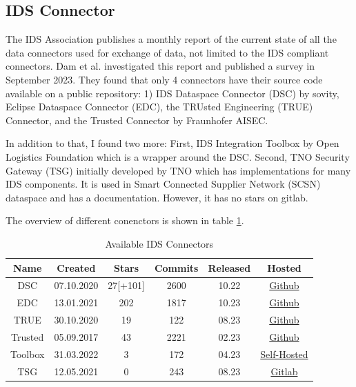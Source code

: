 \documentclass{article}
\begin{document}

\subsection*{IDS Connector}
The IDS Association publishes a monthly report of the current state of all the data connectors used for exchange of data, not limited to the IDS compliant connectors.
 Dam et al. \cite{dam_survey_2023} investigated this report and published a survey in September 2023. They found that only 4 connectors have their source code available on a public repository: 1) IDS Dataspace Connector (DSC) by sovity, Eclipse Dataspace Connector (EDC), the TRUsted Engineering (TRUE) Connector, and the Trusted Connector by Fraunhofer AISEC.

In addition to that, I found two more: First, IDS Integration Toolbox by Open Logistics Foundation which is a wrapper around the DSC. Second, TNO Security Gateway (TSG) initially developed by TNO which has implementations for many IDS components. It is used in Smart Connected Supplier Network (SCSN) dataspace and has a documentation.
However, it has no stars on gitlab.

The overview of different conenctors is shown in table \ref{tab:connectors}.

\begin{table}[ht]
    \label{tab:connectors}
    \centering
    \begin{tabular}{|c c c c c c|}
    \hline
    \textbf{Name} & \textbf{Created} & \textbf{Stars} & \textbf{Commits} & \textbf{Released} & \textbf{Hosted} \\
    \hline
    \hline
    DSC & 07.10.2020 & 27[+101] & 2600 & 10.22 & \href{https://github.com/International-Data-Spaces-Association/DataspaceConnector}{Github} \\
    \hline
    EDC & 13.01.2021 & 202 & 1817 & 10.23 & \href{https://github.com/eclipse-edc/Connector}{Github} \\
    \hline
    TRUE & 30.10.2020 & 19 & 122 & 08.23 & \href{https://github.com/Engineering-Research-and-Development/true-connector}{Github} \\
    \hline
    Trusted & 05.09.2017 & 43 & 2221 & 02.23 & \href{https://github.com/Fraunhofer-AISEC/trusted-connector}{Github} \\ 
    \hline
    Toolbox & 31.03.2022 & 3 & 172 & 04.23 & \href{https://git.openlogisticsfoundation.org/silicon-economy/base/ids/ids-integration-toolbox}{Self-Hosted} \\
    \hline
    TSG & 12.05.2021 & 0 & 243 & 08.23 & \href{https://gitlab.com/tno-tsg}{Gitlab} \\
    \hline
    \end{tabular}
    \caption{Available IDS Connectors}
\end{table}
\end{document}
